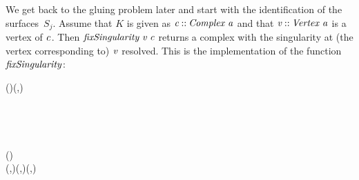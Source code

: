We get back to the gluing problem later and start with the identification
of the surfaces~$S_j$. Assume that $K$ is given as \ensuremath{\Varid{c}\mathbin{::}\Conid{Complex}\;\Varid{a}} and
that \ensuremath{\Varid{v}\mathbin{::}\Conid{Vertex}\;\Varid{a}} is a vertex of \ensuremath{\Varid{c}}. Then \ensuremath{\Varid{fixSingularity}\;\Varid{v}\;\Varid{c}} returns
a complex with the singularity at (the vertex corresponding to) \ensuremath{\Varid{v}} resolved.
This is the implementation of the function \ensuremath{\Varid{fixSingularity}}:
\begin{hscode}\SaveRestoreHook
{}%
%
%
%
%
%
%
%
%
%
%
%
%
%
%
%
%
%
%
%
%
\>[B]{}\mathbin{::}(\;)\Rightarrow {}\;\to {}\;\to {}\;(,){}\<[E]%
\\
\>[B]{}\;\;\mathrel{=}{}\<[23]%
\>[23]{}\;{}\<[28]%
\>[28]{}\<[32]%
\>[32]{}\mathrel{=}{}\<[32E]%
\>[35]{}\mathbin{\&\&\&}\;\<[E]%
\\
\>[28]{}\<[32]%
\>[32]{}\mathrel{=}{}\<[32E]%
\>[35]{}\;\;\<[E]%
\\
\>[28]{}\<[32]%
\>[32]{}\mathrel{=}{}\<[32E]%
\>[35]{}\;\;\<[E]%
\\
\>[23]{}\;{}\<[28]%
\>[28]{}\;\;\<[E]%
\\[\blanklineskip]%
\>[B]{}\mathbin{::}{}\<[21]%
\>[21]{}(\;)\Rightarrow {}\<[E]%
\\
\>[21]{}\;(,)\to {}\;(,)\to {}\;(,){}\<[E]%

\end{hscode}
